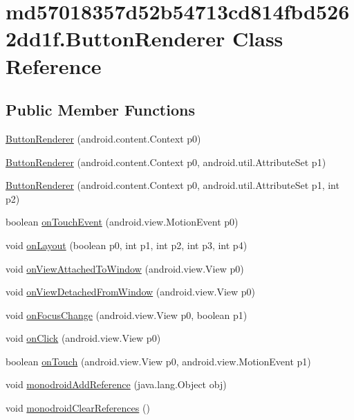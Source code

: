 \hypertarget{classmd57018357d52b54713cd814fbd5262dd1f_1_1_button_renderer}{
\section{md57018357d52b54713cd814fbd5262dd1f.ButtonRenderer Class Reference}
\label{classmd57018357d52b54713cd814fbd5262dd1f_1_1_button_renderer}
}
\subsection*{Public Member Functions}
\begin{CompactItemize}
\item 
\hyperlink{classmd57018357d52b54713cd814fbd5262dd1f_1_1_button_renderer_f7305e740bebafe67f3214621b380601}{ButtonRenderer} (android.content.Context p0)
\item 
\hyperlink{classmd57018357d52b54713cd814fbd5262dd1f_1_1_button_renderer_394e9836ab253d8ba9be78efc809e8d2}{ButtonRenderer} (android.content.Context p0, android.util.AttributeSet p1)
\item 
\hyperlink{classmd57018357d52b54713cd814fbd5262dd1f_1_1_button_renderer_49a2994aa5791809343aab825cacd93d}{ButtonRenderer} (android.content.Context p0, android.util.AttributeSet p1, int p2)
\item 
boolean \hyperlink{classmd57018357d52b54713cd814fbd5262dd1f_1_1_button_renderer_8c6de4a7b4de358182be7eb07060dd03}{onTouchEvent} (android.view.MotionEvent p0)
\item 
void \hyperlink{classmd57018357d52b54713cd814fbd5262dd1f_1_1_button_renderer_ea95208e7b65ea2e2fab71a2b027d47b}{onLayout} (boolean p0, int p1, int p2, int p3, int p4)
\item 
void \hyperlink{classmd57018357d52b54713cd814fbd5262dd1f_1_1_button_renderer_1251093a49d0864f526d797ee9794583}{onViewAttachedToWindow} (android.view.View p0)
\item 
void \hyperlink{classmd57018357d52b54713cd814fbd5262dd1f_1_1_button_renderer_5ac1b7c1483240a116c3722b71146f75}{onViewDetachedFromWindow} (android.view.View p0)
\item 
void \hyperlink{classmd57018357d52b54713cd814fbd5262dd1f_1_1_button_renderer_b3de4f03873d707b061b0aea023eb81c}{onFocusChange} (android.view.View p0, boolean p1)
\item 
void \hyperlink{classmd57018357d52b54713cd814fbd5262dd1f_1_1_button_renderer_9951a44f33f5bdeb1216dbc5f8be12be}{onClick} (android.view.View p0)
\item 
boolean \hyperlink{classmd57018357d52b54713cd814fbd5262dd1f_1_1_button_renderer_0c1824c75b7d6feae196c43f64997685}{onTouch} (android.view.View p0, android.view.MotionEvent p1)
\item 
void \hyperlink{classmd57018357d52b54713cd814fbd5262dd1f_1_1_button_renderer_1901dfa607086d1752758dedb7ebb877}{monodroidAddReference} (java.lang.Object obj)
\item 
void \hyperlink{classmd57018357d52b54713cd814fbd5262dd1f_1_1_button_renderer_82a2afe9fa4940b1718a61bfce8ee0df}{monodroidClearReferences} ()
\end{CompactItemize}
